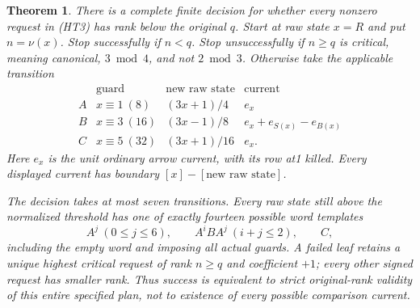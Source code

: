 \documentclass[11pt]{article}
\newtheorem{theorem}{Theorem}
\begin{document}
\begin{theorem}\label{thm:historytransition}
There is a complete finite decision for whether every nonzero request
in (HT3) has rank below the original $q$. Start at raw state $x=R$
and put $n=\nu(x)$. Stop successfully if $n<q$. Stop unsuccessfully
if $n\ge q$ is critical, meaning canonical, $3\bmod4$, and not
$2\bmod3$. Otherwise take the applicable transition
\[
\begin{array}{c|c|c|c}
 &\text{guard}&\text{new raw state}&\text{current}\\ \hline
 A&x\equiv1\ (8)&(3x+1)/4&e_x\\
 B&x\equiv3\ (16)&(3x-1)/8&e_x+e_{S(x)}-e_{B(x)}\\
 C&x\equiv5\ (32)&(3x+1)/16&e_x .
\end{array}
 \tag{HT4}
\]
Here $e_x$ is the unit ordinary arrow current, with its row at1
killed. Every displayed current has boundary $[x]-[\text{new raw state}]$.

The decision takes at most seven transitions. Every raw state still
above the normalized threshold has one of exactly fourteen possible
word templates
\[
 A^j\ (0\le j\le6),\qquad
 A^iBA^j\ (i+j\le2),\qquad C,
 \tag{HT5}
\]
including the empty word and imposing all actual guards.
A failed leaf retains a unique highest critical request of rank
$n\ge q$ and coefficient $+1$; every other signed request has smaller
rank. Thus success is equivalent to strict original-rank validity
of this entire specified plan, not to existence of every possible
comparison current.
\end{theorem}
\end{document}

